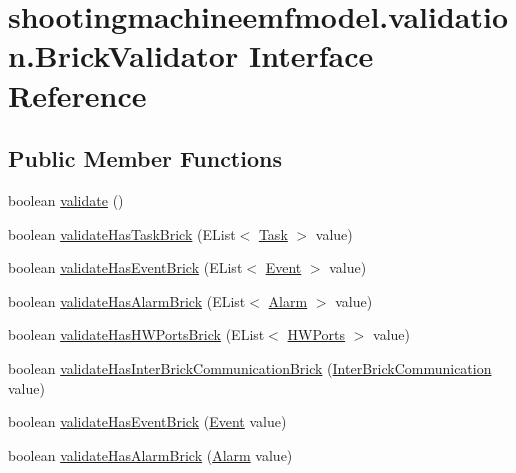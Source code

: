 \hypertarget{interfaceshootingmachineemfmodel_1_1validation_1_1_brick_validator}{\section{shootingmachineemfmodel.\-validation.\-Brick\-Validator Interface Reference}
\label{interfaceshootingmachineemfmodel_1_1validation_1_1_brick_validator}
}
\subsection*{Public Member Functions}
\begin{DoxyCompactItemize}
\item 
boolean \hyperlink{interfaceshootingmachineemfmodel_1_1validation_1_1_brick_validator_ad0711c0cfcb3f5cf85923c2769827fa0}{validate} ()
\item 
boolean \hyperlink{interfaceshootingmachineemfmodel_1_1validation_1_1_brick_validator_abc6ded6c5b3e9004c4f932f2e95f7d59}{validate\-Has\-Task\-Brick} (E\-List$<$ \hyperlink{interfaceshootingmachineemfmodel_1_1_task}{Task} $>$ value)
\item 
boolean \hyperlink{interfaceshootingmachineemfmodel_1_1validation_1_1_brick_validator_a883931b8c7ec583a3f9d5ef5a0188747}{validate\-Has\-Event\-Brick} (E\-List$<$ \hyperlink{interfaceshootingmachineemfmodel_1_1_event}{Event} $>$ value)
\item 
boolean \hyperlink{interfaceshootingmachineemfmodel_1_1validation_1_1_brick_validator_a02f67561de7864db47fc89fa6d6336d9}{validate\-Has\-Alarm\-Brick} (E\-List$<$ \hyperlink{interfaceshootingmachineemfmodel_1_1_alarm}{Alarm} $>$ value)
\item 
boolean \hyperlink{interfaceshootingmachineemfmodel_1_1validation_1_1_brick_validator_a4d616ac1338e0b3c7fda50aa03a3469a}{validate\-Has\-H\-W\-Ports\-Brick} (E\-List$<$ \hyperlink{interfaceshootingmachineemfmodel_1_1_h_w_ports}{H\-W\-Ports} $>$ value)
\item 
boolean \hyperlink{interfaceshootingmachineemfmodel_1_1validation_1_1_brick_validator_ac8dd231522c7c69bba3cf5fd3ed4f9a1}{validate\-Has\-Inter\-Brick\-Communication\-Brick} (\hyperlink{interfaceshootingmachineemfmodel_1_1_inter_brick_communication}{Inter\-Brick\-Communication} value)
\item 
boolean \hyperlink{interfaceshootingmachineemfmodel_1_1validation_1_1_brick_validator_a0e02576254b87ed81e15483bb1189eab}{validate\-Has\-Event\-Brick} (\hyperlink{interfaceshootingmachineemfmodel_1_1_event}{Event} value)
\item 
boolean \hyperlink{interfaceshootingmachineemfmodel_1_1validation_1_1_brick_validator_af3381046983903e10350f5680b06878d}{validate\-Has\-Alarm\-Brick} (\hyperlink{interfaceshootingmachineemfmodel_1_1_alarm}{Alarm} value)
\end{DoxyCompactItemize}


